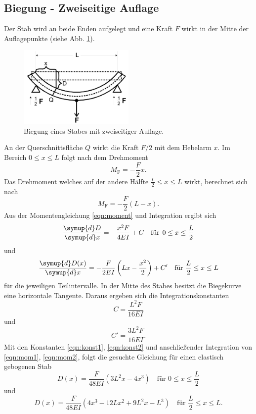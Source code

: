 \subsection{Biegung - Zweiseitige Auflage}
Der Stab wird an beide Enden aufgelegt und eine Kraft $F$ wirkt in der Mitte der Auflagepunkte (siehe Abb. \ref{fig:beidseitig}).
\begin{figure}
    \centering
    \includegraphics[width=0.5\textwidth]{content/data/beidseitig.jpg}
    \caption{Biegung eines Stabes mit zweiseitiger Auflage. \cite{anleitung}}
    \label{fig:beidseitig} 
\end{figure}
An der Querschnittsfläche $Q$ wirkt die Kraft $F/2$ mit dem Hebelarm $x$.
Im Bereich $0 \leq x \leq L$ folgt nach dem Drehmoment
\begin{equation*}
    M_\text{F} = -\frac{F}{2}x .
\end{equation*}
Das Drehmoment welches auf der andere Hälfte $\frac{L}{2} \leq x \leq L$ wirkt, berechnet sich nach
\begin{equation*}
    M_\text{F} = -\frac{F}{2}(L-x) .
\end{equation*}
Aus der Momentengleichung \eqref{eqn:moment} und Integration ergibt sich
\begin{equation}
    \frac{\symup{d}D}{\symup{d}x} = - \frac{x^2F}{4EI} + C \quad \text{für} \:\: 0 \leq x \leq \frac{L}{2}
    \label{eqn:mom1}
\end{equation}
und
\begin{equation}
    \frac{\symup{d}D(x)}{\symup{d}x} = -\frac{F}{2EI} \left( Lx-\frac{x^2}{2} \right) + C' \quad \text{für } \frac{L}{2} \leq x \leq L
    \label{eqn:mom2}
\end{equation}
für die jeweiligen Teilintervalle.
In der Mitte des Stabes besitzt die Biegekurve eine horizontale Tangente.
Daraus ergeben sich die Integrationskonstanten
\begin{equation}
    C = \frac{L^2F}{16EI}
    \label{eqn:konst1}
\end{equation}
und
\begin{equation}
    C' = \frac{3L^2F}{16EI} .
    \label{eqn:konst2}
\end{equation}
Mit den Konstanten \eqref{eqn:konst1}, \eqref{eqn:konst2} und anschließender Integration von \eqref{eqn:mom1}, \eqref{eqn:mom2}, folgt die gesuchte Gleichung für einen elastisch gebogenen Stab
\begin{equation}
    D(x) = \frac{F}{48 E I} \left( 3L^2x -4x^3 \right) \quad \text{für } 0 \leq x \leq \frac{L}{2}
    \label{eqn:moment_links}
\end{equation}
und
\begin{equation}
    D(x) = \frac{F}{48EI} \left( 4x^3-12Lx^2+9L^2x-L^3 \right) \quad \text{für } \frac{L}{2} \leq x \leq L .
\end{equation}